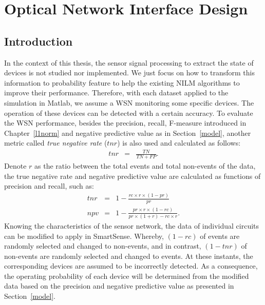 \chapter{Optical Network Interface Design} %
\label{ResultsSS}
\section{Introduction}
In the context of this thesis, the sensor signal processing to extract the state of devices is not studied nor implemented. We just focus on how to transform this information to probability feature to help the existing NILM algorithms to improve their performance. Therefore, with each dataset applied to the simulation in Matlab, we assume a WSN monitoring some specific devices. The operation of these devices can be detected with a certain accuracy.
To evaluate the WSN performance, besides the precision, recall, F-measure introduced in Chapter~\ref{l1norm} and negative predictive value as in Section~\ref{model}, another metric called \textit{true negative rate} ($tnr$) is also used and calculated as follows:
\begin{eqnarray}
tnr &= &\frac{TN}{TN+FP}.
\end{eqnarray}
Denote $r$ as the ratio between the total events and total non-events of the data, the true negative rate and negative predictive value are calculated as functions of precision and recall, such as:
\begin{eqnarray}
tnr &=& 1-\frac{rc\times r\times (1-pr)}{pr} \\
npv &=& 1-\frac{pr\times r\times (1-rc)}{pr \times (1+r)-rc\times r}.
\end{eqnarray}
Knowing the characteristics of the sensor network, the data of individual circuits can be modified to apply in SmartSense. Whereby, $(1-rc)$ of events are randomly selected and changed to non-events, and in contrast, $(1-tnr)$ of non-events are randomly selected and changed to events. At these instants, the corresponding devices are assumed to be incorrectly detected.
As a consequence, the operating probability of each device will be determined from the modified data based on the precision and negative predictive value as presented in Section~\ref{model}.

